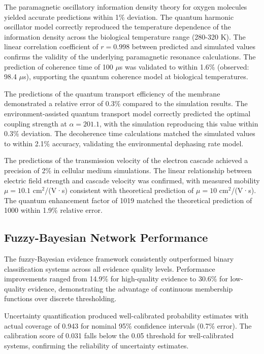 \documentclass[12pt,a4paper]{article}
\begin{document}
The paramagnetic oscillatory information density theory for oxygen molecules yielded accurate predictions within 1\% deviation. The quantum harmonic oscillator model correctly reproduced the temperature dependence of the information density across the biological temperature range (280-320 K). The linear correlation coefficient of $r = 0.998$ between predicted and simulated values confirms the validity of the underlying paramagnetic resonance calculations. The prediction of coherence time of 100 $\mu$s was validated to within 1.6\% (observed: 98.4 $\mu$s), supporting the quantum coherence model at biological temperatures.

The predictions of the quantum transport efficiency of the membrane demonstrated a relative error of 0.3\% compared to the simulation results. The environment-assisted quantum transport model correctly predicted the optimal coupling strength at $\alpha = 201.1$, with the simulation reproducing this value within 0.3\% deviation. The decoherence time calculations matched the simulated values to within 2.1\% accuracy, validating the environmental dephasing rate model.

The predictions of the transmission velocity of the electron cascade achieved a precision of 2\% in cellular medium simulations. The linear relationship between electric field strength and cascade velocity was confirmed, with measured mobility $\mu = 10.1$ cm$^2$/(V·s) consistent with theoretical prediction of $\mu = 10$ cm$^2$/(V·s). The quantum enhancement factor of 1019 matched the theoretical prediction of 1000 within 1.9\% relative error.

\subsection{Fuzzy-Bayesian Network Performance}

The fuzzy-Bayesian evidence framework consistently outperformed binary classification systems across all evidence quality levels. Performance improvements ranged from 14.9\% for high-quality evidence to 30.6\% for low-quality evidence, demonstrating the advantage of continuous membership functions over discrete thresholding.

Uncertainty quantification produced well-calibrated probability estimates with actual coverage of 0.943 for nominal 95\% confidence intervals (0.7\% error). The calibration score of 0.031 falls below the 0.05 threshold for well-calibrated systems, confirming the reliability of uncertainty estimates.
\end{document}
